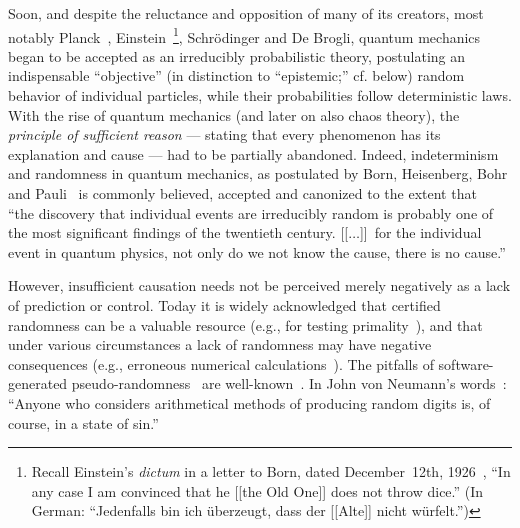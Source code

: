 \documentclass[10pt]{article}%
\begin{document}
Soon, and despite the reluctance and opposition of many of its creators,
most notably Planck~\cite{born-55}, Einstein~\footnote{
Recall Einstein's {\it dictum} in a letter to Born, dated December~12th, 1926~\cite[p.~113]{born-69},
``In any case I am convinced that he [[the Old One]] does not throw dice.''
(In German: ``Jedenfalls bin ich {\"{u}}berzeugt, dass der [[Alte]] nicht w{\"{u}}rfelt.'')},
Schr\"odinger and De Brogli,
quantum mechanics began to be accepted as an irreducibly probabilistic theory,
postulating an indispensable ``objective'' (in distinction to ``epistemic;'' cf. below) random behavior of individual particles,
while their probabilities follow deterministic laws.
With the rise of quantum mechanics (and later on also chaos theory), the {\em principle of sufficient reason}
--- stating that every phenomenon has its explanation and cause ---
had to be partially abandoned.
Indeed,  indeterminism and randomness in quantum mechanics,
as postulated by Born, Heisenberg, Bohr and Pauli~\cite[p.~115]{pauli-probaphysics}
is commonly believed, accepted and canonized to the extent  that~\cite{zeil-05_nature_ofQuantum}
``the discovery that individual events are
irreducibly random is probably one of the
most significant findings of the twentieth
century. [[$\ldots$]]~for the individual event in quantum physics, not only do we not know the cause, there is no cause.''


However, insufficient causation needs not be perceived merely negatively as a lack of prediction or control.
Today it is widely acknowledged that certified randomness can be a valuable resource
(e.g., for testing primality~\cite{ch-schw-78,Granville-92}), and that under various circumstances
a lack of randomness may have negative consequences (e.g., erroneous numerical calculations~\cite{PhysRevE.69.055702}).
The pitfalls of software-generated pseudo-randomness~\cite{v-neumann-50}
are well-known~\cite{Marsaglia-68,DBLP:journals/ibmrd/Pickover91,Bowman1995315,PhysRevE.69.055702}.
In John von Neumann's words~\cite{von-neumann1}:
``Anyone who considers arithmetical methods of producing random digits is, of course, in a state of sin.''
\end{document}
